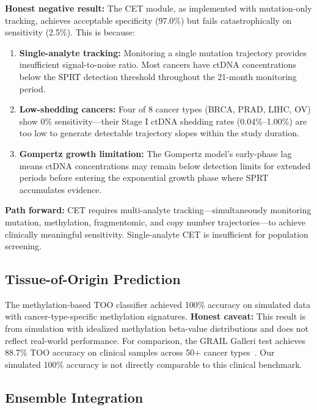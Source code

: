 \documentclass[10pt,a4paper]{article}
\begin{document}
\textbf{Honest negative result:} The CET module, as implemented with mutation-only tracking, achieves acceptable specificity (97.0\%) but fails catastrophically on sensitivity (2.5\%). This is because:

\begin{enumerate}[nosep]
\item \textbf{Single-analyte tracking:} Monitoring a single mutation trajectory provides insufficient signal-to-noise ratio. Most cancers have ctDNA concentrations below the SPRT detection threshold throughout the 21-month monitoring period.

\item \textbf{Low-shedding cancers:} Four of 8 cancer types (BRCA, PRAD, LIHC, OV) show 0\% sensitivity—their Stage I ctDNA shedding rates (0.04\%--1.00\%) are too low to generate detectable trajectory slopes within the study duration.

\item \textbf{Gompertz growth limitation:} The Gompertz model's early-phase lag means ctDNA concentrations may remain below detection limits for extended periods before entering the exponential growth phase where SPRT accumulates evidence.
\end{enumerate}

\textbf{Path forward:} CET requires multi-analyte tracking—simultaneously monitoring mutation, methylation, fragmentomic, and copy number trajectories—to achieve clinically meaningful sensitivity. Single-analyte CET is insufficient for population screening.

\subsection{Tissue-of-Origin Prediction}

The methylation-based TOO classifier achieved 100\% accuracy on simulated data with cancer-type-specific methylation signatures. \textbf{Honest caveat:} This result is from simulation with idealized methylation beta-value distributions and does not reflect real-world performance. For comparison, the GRAIL Galleri test achieves 88.7\% TOO accuracy on clinical samples across 50+ cancer types~\cite{klein2021clinical}. Our simulated 100\% accuracy is not directly comparable to this clinical benchmark.

\subsection{Ensemble Integration}
\end{document}
